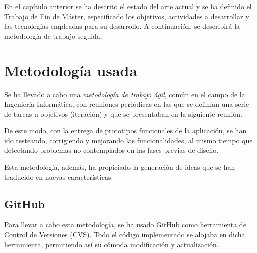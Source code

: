 

En el capítulo anterior se ha descrito el estado del arte actual y se ha definido el Trabajo de Fin de Máster, especificado los objetivos, actividades a desarrollar y las tecnologías empleadas para su desarrollo. A continuación, se describirá la metodología de trabajo seguida.


\section{Metodología usada}
\label{2:sec:1}

Se ha llevado a cabo una {\it metodología de trabajo ágil}, común en el campo de la Ingeniería Informática, con reuniones periódicas en las que se definían una serie de tareas u objetivos (iteración) y que se presentaban en la siguiente reunión. 
\bigskip

De este modo, con la entrega de prototipos funcionales de la aplicación, se han ido testeando, corrigiendo y mejorando las 
funcionalidades, al mismo tiempo que detectando problemas no contemplados en las fases previas de diseño.
\bigskip

Esta metodología, además, ha propiciado la generación de ideas que se han traducido en nuevas características.
\newpage

\subsection{GitHub}
\label{subsec:2.1.1}

Para llevar a cabo esta metodología, se ha usado GitHub como herramienta de Control de Versiones (CVS).
Todo el código implementado se alojaba en dicha herramienta, permitiendo así su cómoda modificación y actualización.


